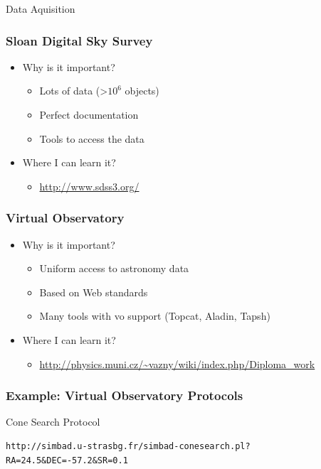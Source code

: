 \documentclass[fleqn]{beamer}
\begin{document}
\begin{section}{Data Aquisition}
  \begin{frame}\frametitle{Sloan Digital Sky Survey}
  \begin{itemize}
    \item{Why is it important?}
      \begin{itemize}
        \item Lots of data (>$10^6$ objects)
        \item Perfect documentation
        \item Tools to access the data
      \end{itemize}
    \item{Where I can learn it?}
      \begin{itemize}
       \item \url{http://www.sdss3.org/}
      \end{itemize}
  \end{itemize}
  \end{frame}

  \begin{frame}\frametitle{Virtual Observatory}
  \begin{itemize}
    \item{Why is it important?}
      \begin{itemize}
        \item Uniform access to astronomy data
        \item Based on Web standards
        \item Many tools with vo support (Topcat, Aladin, Tapsh)
      \end{itemize}
    \item{Where I can learn it?}
      \begin{itemize}
       \item \url{http://physics.muni.cz/~vazny/wiki/index.php/Diploma_work}
      \end{itemize}
  \end{itemize}
  \end{frame}


\begin{frame}[containsverbatim]\frametitle{Example: Virtual
    Observatory Protocols}

Cone Search Protocol

\begin{lstlisting}
http://simbad.u-strasbg.fr/simbad-conesearch.pl?RA=24.5&DEC=-57.2&SR=0.1
\end{lstlisting}



\end{frame}
\end{section}
\end{document}
